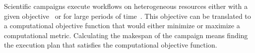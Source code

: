 Scientific campaigns execute workflows on heterogeneous resources either with a given objective~\cite{casajus2010dirac} or for large periods of time~\cite{maeno2008panda}.
This objective can be translated to a computational objective function that would either minimize or maximize a computational metric.
Calculating the makespan of the campaign means finding the execution plan that satisfies the computational objective function.





